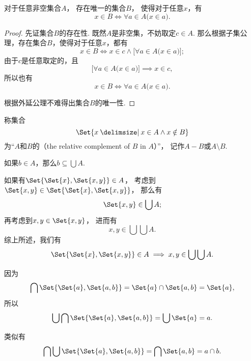 \begin{theorem}\label{theorem:集合论.系的交的唯一存在性}
对于任意非空集合\(A\)，%
存在唯一的集合\(B\)，%
使得对于任意\(x\)，有\[
	x \in B
	\iff
	\forall a \in A \bigl( x \in a \bigr).
\]
\begin{proof}
先证集合\(B\)的存在性.
既然\(A\)是非空集，不妨取定\(c \in A\).
那么根据子集公理，存在集合\(B\)，使得对于任意\(x\)，都有\[
	x \in B
	\iff x \in c \land \bigl[ \forall a \in A \bigl( x \in a \bigr) \bigr];
\]
由于\(c\)是任意取定的，且\[
	\bigl[ \forall a \in A \bigl( x \in a \bigr) \bigr]
	\implies
	x \in c,
\]
所以也有\[
	x \in B
	\iff \forall a \in A \bigl( x \in a \bigr).
\]

根据外延公理不难得出集合\(B\)的唯一性.
\end{proof}
\end{theorem}

\begin{definition}
称集合\[
\Set{ x \given x \in A \land x \notin B }
\]为“\(A\)和\(B\)的（the relative complement of \(B\) in \(A\)）”，%
记作\(A - B\)或\(A \setminus B\).
\end{definition}

\begin{example}
如果\(b \in A\)，那么\(b \subseteq \bigcup A\).
\end{example}

\begin{example}\label{example:集合论.有序对各坐标的取值范围}
如果有\(\Set{ \Set{x}, \Set{x,y} } \in A\)，
考虑到\(\Set{x,y} \in \Set{ \Set{x}, \Set{x,y} }\)，
那么有\[
	\Set{x,y} \in \bigcup A;
\]
再考虑到\(x,y \in \Set{x,y}\)，
进而有\[
	x,y \in \bigcup\bigcup A.
\]
综上所述，我们有
\begin{equation}
	\Set{ \Set{x}, \Set{x,y} } \in A
	\implies
	x,y \in \bigcup\bigcup A.
\end{equation}
\end{example}

\begin{example}
因为\[
	\bigcap\Set{\Set{a},\Set{a,b}}
	= \Set{a}\cap\Set{a,b}
	= \Set{a},
\]
所以\[
	\bigcup\bigcap\Set{\Set{a},\Set{a,b}}
	= \bigcup\Set{a}
	= a.
\]

类似有\[
	\bigcap\bigcup\Set{\Set{a},\Set{a,b}}
	= \bigcap\Set{a,b}
	= a \cap b.
\]
\end{example}


